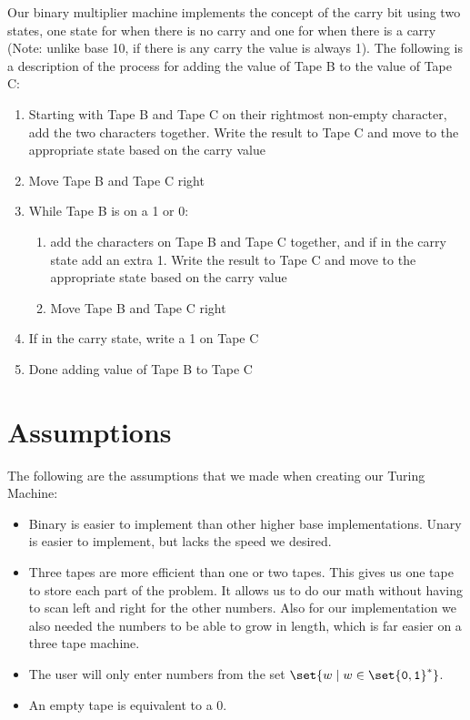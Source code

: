 \documentclass{article}
\begin{document}
\noindent Our binary multiplier machine implements the concept of the carry bit using two states, one state for when there is no carry and one for when there is a carry (Note: unlike base 10, if there is any carry the value is always 1). The following is a description of the process for adding the value of Tape B to the value of Tape C:
\begin{enumerate}
\item Starting with Tape B and Tape C on their rightmost non-empty character, add the two characters together. Write the result to Tape C and move to the appropriate state based on the carry value
\item Move Tape B and Tape C right
\item While Tape B is on a 1 or 0:
\begin{enumerate}
	\item add the characters on Tape B and Tape C together, and if in the carry state add an extra 1. Write the result to Tape C and move to the appropriate state based on the carry value
	\item Move Tape B and Tape C right
\end{enumerate}
\item If in the carry state, write a 1 on Tape C
\item Done adding value of Tape B to Tape C
\end{enumerate}


\section*{Assumptions}
The following are the assumptions that we made when creating our Turing Machine:
\begin{itemize}
	\item Binary is easier to implement than other higher base implementations. Unary is easier to implement, but lacks the speed we desired. 
	\item Three tapes are more efficient than one or two tapes. This gives us one tape to store each part of the problem. It allows us to do our math without having to scan left and right for the other numbers. Also for our implementation we also needed the numbers to be able to grow in length, which is far easier on a three tape machine.
	\item The user will only enter numbers from the set $\set{w \mid w \in \set{\mathtt{0},\mathtt{1}}^*}$.
	\item An empty tape is equivalent to a 0.
\end{itemize}
\end{document}
